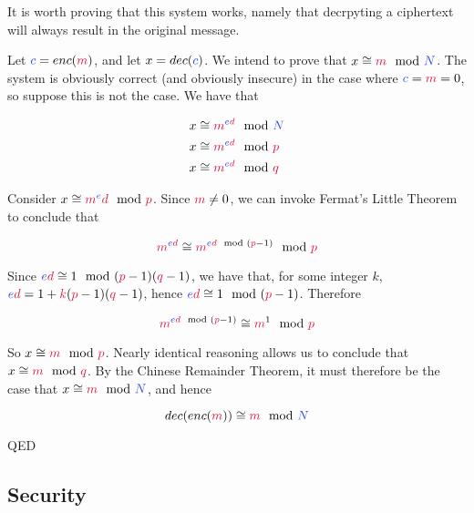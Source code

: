 	It is worth proving that this system works, namely that decrpyting a ciphertext will always result in the original message.

	\vspace{5mm}
	
	Let $\cc = enc(\cm)$, and let $x = dec(\cc)$. We intend to prove that $x \cong \cm \mod \cN$. The system is obviously correct (and obviously insecure) in the case where $\cc=\cm=0$, so suppose this is not the case. We have that
	
	\begin{align*}
	    x &\cong \cm^{\ce\cd} \mod \cN\\
	    x &\cong \cm^{\ce\cd} \mod \cp\\
	    x &\cong \cm^{\ce\cd} \mod \cq
	\end{align*}
	
	Consider $x \cong \cm^{\ce}\cd \mod \cp$. Since $\cm \neq 0$, we can invoke Fermat's Little Theorem to conclude that
	
	$$
	    \cm^{\ce\cd} \cong \cm^{\ce\cd \mod (\cp-1)} \mod \cp
	$$
	
	Since $\ce\cd \cong 1 \mod (\cp-1)(\cq-1)$, we have that, for some integer $k$, $\ce\cd = 1 + \ck(\cp-1)(\cq-1)$, hence $\ce\cd \cong 1 \mod (\cp-1)$. Therefore
	
	$$
	    \cm^{\ce\cd \mod (\cp-1)}\cong \cm^1 \mod \cp
	$$
	
	So $x \cong \cm \mod \cp$. Nearly identical reasoning allows us to conclude that $x \cong \cm \mod \cq$. By the Chinese Remainder Theorem, it must therefore be the case that $x \cong \cm \mod \cN$, and hence
	
	$$
	    dec(enc(\cm)) \cong \cm \mod \cN 
	$$
	
	\begin{flushright}
	QED
	\end{flushright}
	\subsection{Security}

